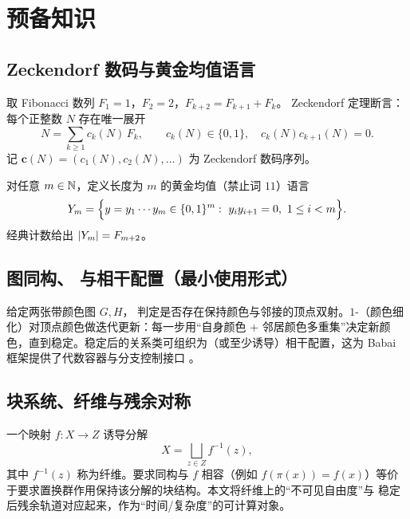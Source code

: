 
\section{预备知识}

\subsection{Zeckendorf 数码与黄金均值语言}

取 Fibonacci 数列 $F_1=1$，$F_2=2$，$F_{k+2}=F_{k+1}+F_k$。
Zeckendorf 定理断言：每个正整数 $N$ 存在唯一展开
$$
N=\sum_{k\ge 1} c_k(N)\,F_k,\qquad c_k(N)\in\{0,1\},\quad c_k(N)c_{k+1}(N)=0.
$$
记 $\mathbf c(N)=(c_1(N),c_2(N),\dots)$ 为 Zeckendorf 数码序列。

对任意 $m\in\mathbb{N}$，定义长度为 $m$ 的黄金均值（禁止词 $11$）语言
$$
\Ym=\Bigl\{y=y_1\cdots y_m\in\{0,1\}^m:\ y_i y_{i+1}=0,\ 1\le i<m\Bigr\}.
$$
经典计数给出 $\left\lvert Y_m\right\rvert=F_{m+2}$。

\subsection{图同构、\WL{} 与相干配置（最小使用形式）}

给定两张带颜色图 $G,H$，\GI{} 判定是否存在保持颜色与邻接的顶点双射。$1$-\WL{}（颜色细化）对顶点颜色做迭代更新：每一步用“自身颜色 + 邻居颜色多重集”决定新颜色，直到稳定。稳定后的关系类可组织为（或至少诱导）相干配置，这为 Babai 框架提供了代数容器与分支控制接口 \cite{babai2016gi,ivanov2013coherent,wl2018symmetryvsregularity}。

\subsection{块系统、纤维与残余对称}

一个映射 $f:X\to Z$ 诱导分解
$$
X=\bigsqcup_{z\in Z} f^{-1}(z),
$$
其中 $f^{-1}(z)$ 称为纤维。要求同构与 $f$ 相容（例如 $f(\pi(x))=f(x)$）等价于要求置换群作用保持该分解的块结构。本文将纤维上的“不可见自由度”与 \WL{} 稳定后残余轨道对应起来，作为“时间/复杂度”的可计算对象。

